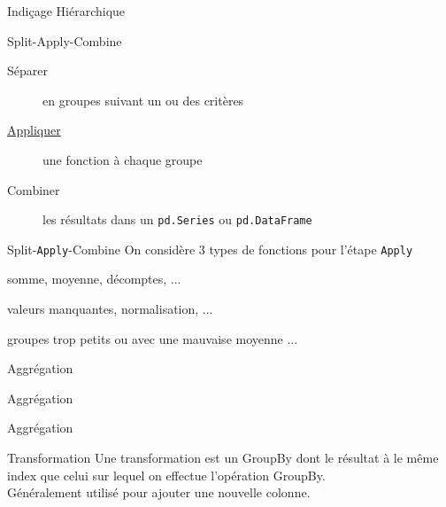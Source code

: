 \begin{frame}{Indiçage Hiérarchique}
\end{frame}

\begin{frame}{Split-Apply-Combine}
  \begin{description}
    \item[Séparer]   en groupes suivant un ou des critères
    \item[\underline{Appliquer}] une fonction à chaque groupe
    \item[Combiner]  les résultats dans un \texttt{pd.Series} ou \texttt{pd.DataFrame}
  \end{description}
\end{frame}

\begin{frame}{Split-\texttt{Apply}-Combine}
  On considère 3 types de fonctions pour l'étape \texttt{Apply}
  \begin{description}[r,labelwidth=\widthof{   Transformation :}]
    \item[Agrégation :]   somme, moyenne, décomptes, ... 
    \item[Transformation :] valeurs manquantes, normalisation, ... 
    \item[Filtrage :]  groupes trop petits ou avec une mauvaise moyenne ... 
  \end{description}
\end{frame}

\begin{frame}{Aggrégation}
\end{frame}

\begin{frame}{Aggrégation}
\end{frame}

\begin{frame}{Aggrégation}
\end{frame}

\begin{frame}{Transformation}
  Une transformation est un GroupBy dont le résultat à le même index que celui sur lequel on effectue l'opération GroupBy. \\
  Généralement utilisé pour ajouter une nouvelle colonne.
\end{frame}


